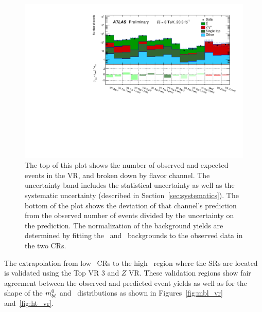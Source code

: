 \begin{figure}[ht]
\centering
\includegraphics[width=\textwidth]{figs/blstop/histpull_VR_detailed.pdf}
\caption{The top of this plot shows the number of observed and expected
  events in the VR, and broken down by flavor channel.
  The uncertainty band includes the statistical uncertainty as well as the
  systematic uncertainty (described in Section~\ref{sec:systematics}). The
  bottom of the plot shows the deviation of that channel's prediction
  from the observed number of events divided by the uncertainty on the
  prediction. The normalization of the background yields are determined
  by fitting the \TTBAR\ and \ZGAMMAJETS\ backgrounds to the observed
  data in the two CRs.
}
\label{fig:pull_dist_vr}
\end{figure}

The extrapolation from low \HT\ CRs to the high \HT\ region
where the SRs are located is validated using the Top VR 3
and $Z$ VR. These validation regions show fair
agreement between the observed and predicted event yields as well as
for the shape of the $m_{b\ell}^{0}$ and \HT\ distributions as shown in
Figures~\ref{fig:mbl_vr} and~\ref{fig:ht_vr}.

